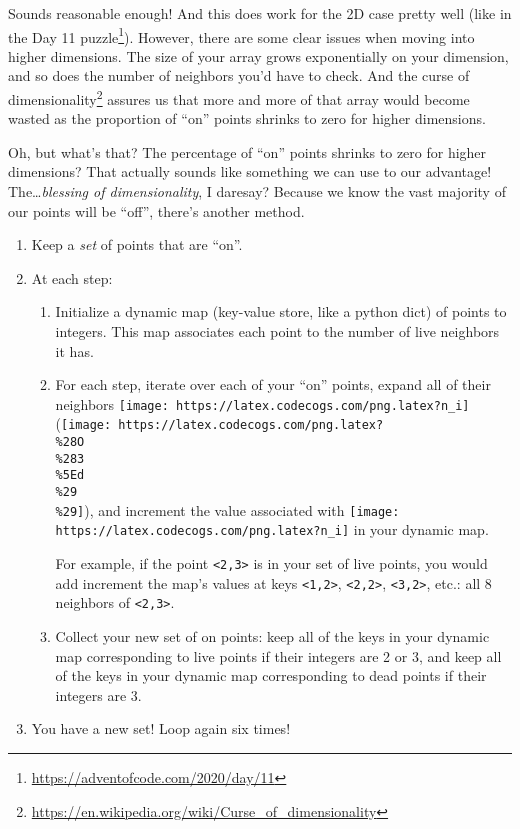 \documentclass[]{article}
\renewcommand{\href}[2]{#2\footnote{\url{#1}}}
\begin{document}
Sounds reasonable enough! And this does work for the 2D case pretty well (like
in the \href{https://adventofcode.com/2020/day/11}{Day 11 puzzle}). However,
there are some clear issues when moving into higher dimensions. The size of your
array grows exponentially on your dimension, and so does the number of neighbors
you'd have to check. And the
\href{https://en.wikipedia.org/wiki/Curse_of_dimensionality}{curse of
dimensionality} assures us that more and more of that array would become wasted
as the proportion of ``on'' points shrinks to zero for higher dimensions.

Oh, but what's that? The percentage of ``on'' points shrinks to zero for higher
dimensions? That actually sounds like something we can use to our advantage!
The\ldots{}\emph{blessing of dimensionality}, I daresay? Because we know the
vast majority of our points will be ``off'', there's another method.

\begin{enumerate}
\def\labelenumi{\arabic{enumi}.}
\tightlist
\item
  Keep a \emph{set} of points that are ``on''.
\item
  At each step:

  \begin{enumerate}
  \def\labelenumii{\alph{enumii}.}
  \item
    Initialize a dynamic map (key-value store, like a python dict) of points to
    integers. This map associates each point to the number of live neighbors it
    has.
  \item
    For each step, iterate over each of your ``on'' points, expand all of their
    neighbors \texttt{[image: https://latex.codecogs.com/png.latex?n\_i]}
    (\texttt{[image: https://latex.codecogs.com/png.latex?\\\%28O\\\%283\\\%5Ed\\\%29\\\%29]}),
    and increment the value associated with
    \texttt{[image: https://latex.codecogs.com/png.latex?n\_i]} in your dynamic
    map.

    For example, if the point \texttt{\textless{}2,3\textgreater{}} is in your
    set of live points, you would add increment the map's values at keys
    \texttt{\textless{}1,2\textgreater{}},
    \texttt{\textless{}2,2\textgreater{}},
    \texttt{\textless{}3,2\textgreater{}}, etc.: all 8 neighbors of
    \texttt{\textless{}2,3\textgreater{}}.
  \item
    Collect your new set of on points: keep all of the keys in your dynamic map
    corresponding to live points if their integers are 2 or 3, and keep all of
    the keys in your dynamic map corresponding to dead points if their integers
    are 3.
  \end{enumerate}
\item
  You have a new set! Loop again six times!
\end{enumerate}
\end{document}
